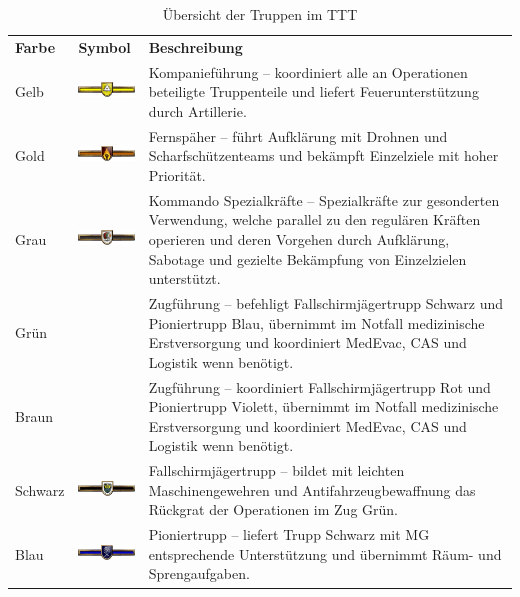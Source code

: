 \begin{longtable}{| >{\columncolor{backcolor}}l |p{3cm} | p{10cm} |} 
	\caption[Truppübersicht]{Übersicht der Truppen im TTT} \\
	\hline
	\textbf{Farbe} & \textbf{Symbol} & \textbf{Beschreibung} \\
	Gelb & \includegraphics [width=20mm]{./Grafiken/Abschnitt/TrGelb} & Kompanieführung -- koordiniert alle an Operationen beteiligte Truppenteile und liefert Feuerunterstützung durch Artillerie. \\
	\hline
	Gold & \includegraphics[width=20mm]{./Grafiken/Abschnitt/TrGold} & Fernspäher -- führt Aufklärung mit Drohnen und Scharfschützenteams und bekämpft Einzelziele mit hoher Priorität.\\
	\hline
	Grau & \includegraphics[width=20mm]{./Grafiken/Abschnitt/TrGrau} & Kommando Spezialkräfte -- Spezialkräfte zur gesonderten Verwendung, welche parallel zu den regulären Kräften operieren und deren Vorgehen durch Aufklärung, Sabotage und gezielte Bekämpfung von Einzelzielen unterstützt. \\
	\hline
	Grün &  & Zugführung -- befehligt Fallschirmjägertrupp Schwarz und Pioniertrupp Blau, übernimmt im Notfall medizinische Erstversorgung und koordiniert \ac{MedEvac}, \ac{CAS} und Logistik wenn benötigt. \\
	\hline
	Braun &   &Zugführung -- koordiniert Fallschirmjägertrupp Rot und Pioniertrupp Violett, übernimmt im Notfall medizinische Erstversorgung und koordiniert \ac{MedEvac}, \ac{CAS} und Logistik wenn benötigt. \\
	\hline
	Schwarz & \includegraphics[width=20mm]{./Grafiken/Abschnitt/TrSchwarz} &Fallschirmjägertrupp -- bildet mit leichten Maschinengewehren und Antifahrzeugbewaffnung das Rückgrat der Operationen im Zug Grün. \\
	\hline
	Blau & \includegraphics[width=20mm]{./Grafiken/Abschnitt/TrBlau} & Pioniertrupp -- liefert Trupp Schwarz mit MG entsprechende Unterstützung und übernimmt Räum- und Sprengaufgaben.\\

\end{longtable}
